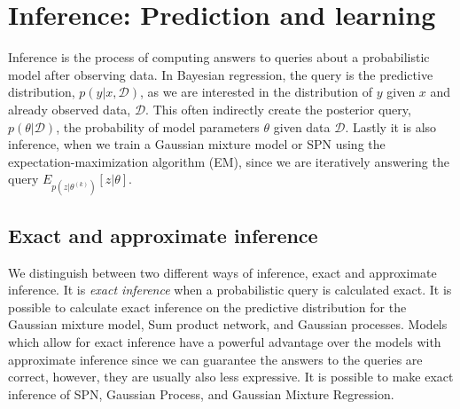 \chapter{Inference: Prediction and learning}


Inference is the process of computing answers to queries about a probabilistic model after observing data. 
In Bayesian regression, the
query is the predictive distribution, $p(y|x,\mathcal{D})$, as we are interested in the distribution of $y$ given $x$ 
and already observed data, $\mathcal{D}$. 
This often indirectly create the posterior query, $p(\theta|\mathcal{D})$, the probability of model parameters $\theta$ given data
$\mathcal{D}$. Lastly it is also inference, when we train 
a Gaussian mixture model or SPN using the expectation-maximization algorithm (EM), since we are iteratively answering the query
$E_{p(z|\theta^{(k)})}[z|\theta]$.



\section{Exact and approximate inference}
We distinguish between two different ways of inference, exact and approximate inference.
It is \textit{exact inference} when a probabilistic query is calculated exact. It is possible to calculate exact inference on 
the predictive distribution for the Gaussian mixture model, Sum product network, and Gaussian processes. Models which allow 
for exact inference have a powerful advantage over the models with approximate inference since we can guarantee
 the answers to the queries are
correct, however, they are usually also less expressive. It is possible to
make exact inference of SPN, Gaussian Process, and Gaussian Mixture Regression. 

